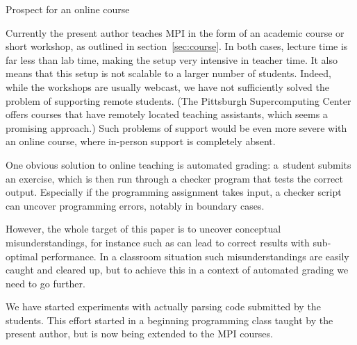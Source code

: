 \begin{comment}
  \Level 2 {Evaluation and supervision}

  In our academic class the programming exercises are done partly in
  class and partly as homework. They are very lightly
  graded: the majority of the grade comes from a programming project
  that is the student's own initiative and coded from scratch.

  In the workshop format there is no grading, but the instructor plus
  possible assistants are continuously monitoring students to help them
  over stumbling blocks and clarify concepts, both in MPI and elementary
  programming. We have found that one instructor or assistant per 8--10
  students is a good ratio; more students per instructor will have
  students fall by the wayside. The typical exercise takes 15--30 minutes.
\end{comment}

 {Prospect for an online course}
\label{sec:online}

Currently the present author teaches MPI in the form of an academic
course or short workshop, as outlined in section~\ref{sec:course}.
In both cases, lecture time is far less than lab time, making the
setup very intensive in teacher time. It also means that this setup is
not scalable to a larger number of students. Indeed, while the
workshops are usually webcast, we have not sufficiently solved the
problem of supporting remote students. (The Pittsburgh Supercomputing
Center offers courses that have remotely located teaching assistants,
which seems a promising approach.)
Such problems of support would be even more severe with an online
course, where in-person support is completely absent.

One obvious solution to online teaching is automated grading:
a~student submits an exercise, which is then run through a checker
program that tests the correct output. Especially if the programming
assignment takes input, a checker script can uncover programming
errors, notably in boundary cases.

However, the whole target of this paper is to uncover conceptual
misunderstandings, for instance such as can lead to correct results
with sub-optimal performance. In a classroom situation such
misunderstandings are easily caught and cleared up, but to achieve
this in a context of automated grading we need to go further.

We have started experiments with actually parsing code submitted by
the students. This effort started in a beginning programming class
taught by the present author, but is now being extended to the MPI courses.

